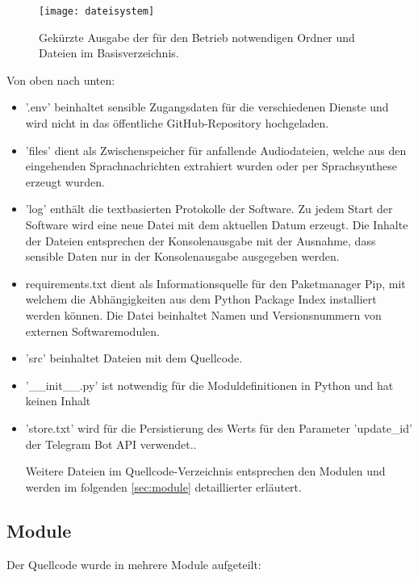 \begin{figure}[h!]
\centering
\texttt{[image: dateisystem]}
\caption{Gekürzte Ausgabe der für den Betrieb notwendigen Ordner und Dateien im Basisverzeichnis.}
\label{fig:dateisystem}
\end{figure}

Von oben nach unten: 

\begin{itemize}
\item '.env' beinhaltet sensible Zugangsdaten für die verschiedenen Dienste und wird nicht in das öffentliche GitHub-Repository hochgeladen. 
\item 'files' dient als Zwischenspeicher für anfallende Audiodateien, welche aus den eingehenden Sprachnachrichten extrahiert wurden oder per Sprachsynthese erzeugt wurden. 
\item 'log' enthält die textbasierten Protokolle der Software. Zu jedem Start der Software wird eine neue Datei mit dem aktuellen Datum erzeugt. Die Inhalte der Dateien entsprechen der Konsolenausgabe mit der Ausnahme, dass sensible Daten nur in der Konsolenausgabe ausgegeben werden. 
\item requirements.txt dient als Informationsquelle für den Paketmanager Pip, mit welchem die Abhängigkeiten aus dem Python Package Index installiert werden können. Die Datei beinhaltet Namen und Versionsnummern von externen Softwaremodulen. 
\item 'src' beinhaltet Dateien mit dem Quellcode. 
\item '\_\_init\_\_.py' ist notwendig für die Moduldefinitionen in Python und hat keinen Inhalt 
\item 'store.txt' wird für die Persistierung des Werts für den Parameter 'update\_id' der Telegram Bot API verwendet.\cite[S. 337]{python}.

Weitere Dateien im Quellcode-Verzeichnis entsprechen den Modulen und werden im folgenden \autoref{sec:module} detaillierter erläutert. 

\end{itemize}

\subsection{Module}
\label{sec:module}

Der Quellcode wurde in mehrere Module aufgeteilt:

